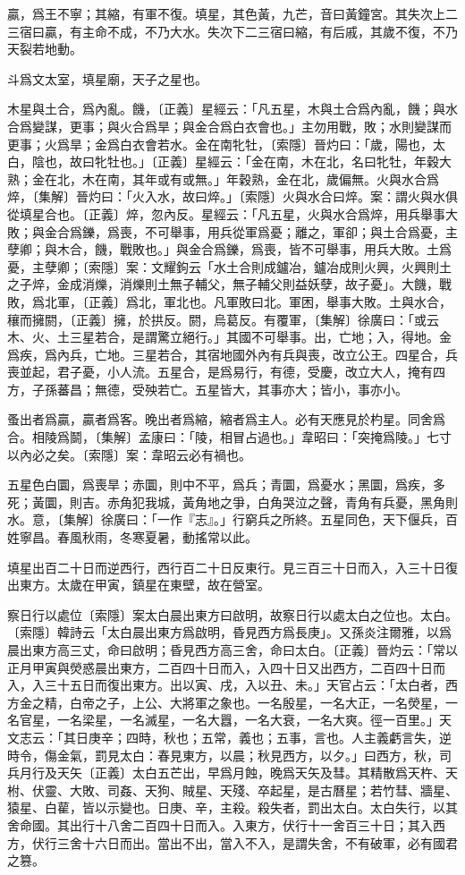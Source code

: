 贏，爲王不寧；其縮，有軍不復。填星，其色黃，九芒，音曰黃鐘宮。其失次上二三宿曰贏，有主命不成，不乃大水。失次下二三宿曰縮，有后戚，其歲不復，不乃天裂若地動。

斗爲文太室，填星廟，天子之星也。

木星與土合，爲內亂。饑，〔正義〕星經云：「凡五星，木與土合爲內亂，饑；與水合爲變謀，更事；與火合爲旱；與金合爲白衣會也。」主勿用戰，敗；水則變謀而更事；火爲旱；金爲白衣會若水。金在南牝牡，〔索隱〕晉灼曰：「歲，陽也，太白，陰也，故曰牝牡也。」〔正義〕星經云：「金在南，木在北，名曰牝牡，年穀大熟；金在北，木在南，其年或有或無。」年穀熟，金在北，歲偏無。火與水合爲焠，〔集解〕晉灼曰：「火入水，故曰焠。」〔索隱〕火與水合曰焠。案：謂火與水俱從填星合也。〔正義〕焠，忽內反。星經云：「凡五星，火與水合爲焠，用兵舉事大敗；與金合爲鑠，爲喪，不可舉事，用兵從軍爲憂；離之，軍卻；與土合爲憂，主孽卿；與木合，饑，戰敗也。」與金合爲鑠，爲喪，皆不可舉事，用兵大敗。土爲憂，主孽卿；〔索隱〕案：文耀鉤云「水土合則成鑪冶，鑪冶成則火興，火興則土之子焠，金成消爍，消爍則土無子輔父，無子輔父則益妖孽，故子憂」。大饑，戰敗，爲北軍，〔正義〕爲北，軍北也。凡軍敗曰北。軍困，舉事大敗。土與水合，穰而擁閼，〔正義〕擁，於拱反。閼，烏葛反。有覆軍，〔集解〕徐廣曰：「或云木、火、土三星若合，是謂驚立絕行。」其國不可舉事。出，亡地；入，得地。金爲疾，爲內兵，亡地。三星若合，其宿地國外內有兵與喪，改立公王。四星合，兵喪並起，君子憂，小人流。五星合，是爲易行，有德，受慶，改立大人，掩有四方，子孫蕃昌；無德，受殃若亡。五星皆大，其事亦大；皆小，事亦小。

蚤出者爲贏，贏者爲客。晚出者爲縮，縮者爲主人。必有天應見於杓星。同舍爲合。相陵爲鬬，〔集解〕孟康曰：「陵，相冒占過也。」韋昭曰：「突掩爲陵。」七寸以內必之矣。〔索隱〕案：韋昭云必有禍也。

五星色白圜，爲喪旱；赤圜，則中不平，爲兵；青圜，爲憂水；黑圜，爲疾，多死；黃圜，則吉。赤角犯我城，黃角地之爭，白角哭泣之聲，青角有兵憂，黑角則水。意，〔集解〕徐廣曰：「一作『志』。」行窮兵之所終。五星同色，天下偃兵，百姓寧昌。春風秋雨，冬寒夏暑，動搖常以此。

填星出百二十日而逆西行，西行百二十日反東行。見三百三十日而入，入三十日復出東方。太歲在甲寅，鎮星在東壁，故在營室。

察日行以處位〔索隱〕案太白晨出東方曰啟明，故察日行以處太白之位也。太白。〔索隱〕韓詩云「太白晨出東方爲啟明，昏見西方爲長庚」。又孫炎注爾雅，以爲晨出東方高三丈，命曰啟明；昏見西方高三舍，命曰太白。〔正義〕晉灼云：「常以正月甲寅與熒惑晨出東方，二百四十日而入，入四十日又出西方，二百四十日而入，入三十五日而復出東方。出以寅、戌，入以丑、未。」天官占云：「太白者，西方金之精，白帝之子，上公、大將軍之象也。一名殷星，一名大正，一名熒星，一名官星，一名梁星，一名滅星，一名大囂，一名大衰，一名大爽。徑一百里。」天文志云：「其日庚辛；四時，秋也；五常，義也；五事，言也。人主義虧言失，逆時令，傷金氣，罰見太白：春見東方，以晨；秋見西方，以夕。」曰西方，秋，司兵月行及天矢〔正義〕太白五芒出，早爲月蝕，晚爲天矢及彗。其精散爲天杵、天柎、伏靈、大敗、司姦、天狗、賊星、天殘、卒起星，是古曆星；若竹彗、牆星、猿星、白雚，皆以示變也。日庚、辛，主殺。殺失者，罰出太白。太白失行，以其舍命國。其出行十八舍二百四十日而入。入東方，伏行十一舍百三十日；其入西方，伏行三舍十六日而出。當出不出，當入不入，是謂失舍，不有破軍，必有國君之篡。

